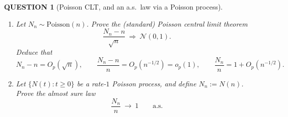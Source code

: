 \documentclass[12pt]{article}
\renewcommand{\(}{\left(}%
\renewcommand{\)}{\right)}%
\renewcommand{\[}{\left[}%
\renewcommand{\]}{\right]}%
\newtheorem{question}{QUESTION}[section]}
\begin{document}
\begin{question}[Poisson CLT, and an a.s.\ law via a Poisson process]
\leavevmode
\begin{enumerate}
\item Let $N_n\sim \mathrm{Poisson}(n)$. Prove the (standard) Poisson central limit theorem
\begin{equation*}
\frac{N_n-n}{\sqrt{n}}\ \Rightarrow\ \mathcal N(0,1).
\end{equation*}
Deduce that
\begin{equation*}
N_n-n=O_p(\sqrt n),
\qquad
\frac{N_n-n}{n}=O_p(n^{-1/2})=o_p(1),
\qquad
\frac{N_n}{n}=1+O_p(n^{-1/2}).
\end{equation*}

\item Let $\{N(t):t\ge0\}$ be a rate-$1$ Poisson process, and define $N_n:=N(n)$. Prove the almost sure law
\begin{equation*}
\frac{N_n}{n}\ \to\ 1
\qquad\text{a.s.}
\end{equation*}
\end{enumerate}
\end{question}
\end{document}
